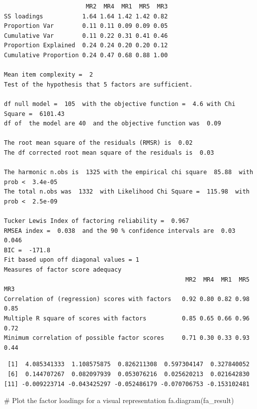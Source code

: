 \documentclass[
  letterpaper,
  DIV=11,
  numbers=noendperiod]{scrreprt}
\newenvironment{Shaded}{\begin{snugshade}}{\end{snugshade}}
\newcommand{\CommentTok}[1]{\textcolor[rgb]{0.37,0.37,0.37}{#1}}
\newcommand{\FunctionTok}[1]{\textcolor[rgb]{0.28,0.35,0.67}{#1}}
\newcommand{\NormalTok}[1]{\textcolor[rgb]{0.00,0.23,0.31}{#1}}
\newcommand{\SpecialCharTok}[1]{\textcolor[rgb]{0.37,0.37,0.37}{#1}}
\begin{document}
\begin{verbatim}
                       MR2  MR4  MR1  MR5  MR3
SS loadings           1.64 1.64 1.42 1.42 0.82
Proportion Var        0.11 0.11 0.09 0.09 0.05
Cumulative Var        0.11 0.22 0.31 0.41 0.46
Proportion Explained  0.24 0.24 0.20 0.20 0.12
Cumulative Proportion 0.24 0.47 0.68 0.88 1.00

Mean item complexity =  2
Test of the hypothesis that 5 factors are sufficient.

df null model =  105  with the objective function =  4.6 with Chi Square =  6101.43
df of  the model are 40  and the objective function was  0.09 

The root mean square of the residuals (RMSR) is  0.02 
The df corrected root mean square of the residuals is  0.03 

The harmonic n.obs is  1325 with the empirical chi square  85.88  with prob <  3.4e-05 
The total n.obs was  1332  with Likelihood Chi Square =  115.98  with prob <  2.5e-09 

Tucker Lewis Index of factoring reliability =  0.967
RMSEA index =  0.038  and the 90 % confidence intervals are  0.03 0.046
BIC =  -171.8
Fit based upon off diagonal values = 1
Measures of factor score adequacy             
                                                   MR2  MR4  MR1  MR5  MR3
Correlation of (regression) scores with factors   0.92 0.80 0.82 0.98 0.85
Multiple R square of scores with factors          0.85 0.65 0.66 0.96 0.72
Minimum correlation of possible factor scores     0.71 0.30 0.33 0.93 0.44
\end{verbatim}

\begin{Shaded}
\end{Shaded}

\begin{verbatim}
 [1]  4.085341333  1.108575875  0.826211308  0.597304147  0.327840052
 [6]  0.144707267  0.082097939  0.053076216  0.025620213  0.021642830
[11] -0.009223714 -0.043425297 -0.052486179 -0.070706753 -0.153102481
\end{verbatim}

\begin{Shaded}
\begin{Highlighting}[]
\CommentTok{\# Plot the factor loadings for a visual representation}
\FunctionTok{fa.diagram}\NormalTok{(fa\_result)}
\end{Highlighting}
\end{Shaded}
\end{document}
